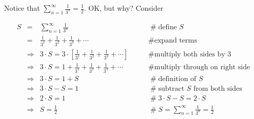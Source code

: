 \documentclass[11pt, oneside]{article}   	%
\begin{document}
Notice that  $\sum\limits_{n = 1}^\infty \frac{1}{3^n}  = \frac{1}{2}$. OK, but why? Consider 
      
\begin{equation*}
\begin{array}{lllll}
S
&=& \sum\limits_{n = 1}^\infty \frac{1}{3^n}                                                                            &\qquad  \mathrel{\#} \text{define $S$}                                \\ 
&=& \frac{1}{3^1} + \frac{1}{3^2} + \frac{1}{3^3} + \cdots                                                       &\qquad  \mathrel{\#} \text{expand terms}                           \\
&\Rightarrow& 3 \cdot S = 3 \cdot [\frac{1}{3^1} + \frac{1}{3^2} + \frac{1}{3^3} + \cdots ]      &\qquad  \mathrel{\#} \text{multiply both sides by 3}           \\
&\Rightarrow& 3 \cdot S = 1 + \frac{1}{3^1} + \frac{1}{3^2} + \frac{1}{3^3} + \cdots               &\qquad  \mathrel{\#} \text{multiply through on right side}  \\
&\Rightarrow& 3 \cdot S = 1 + S                                                                                             &\qquad  \mathrel{\#} \text{definition of $S$}                      \\
&\Rightarrow& 3 \cdot S - S = 1                                                                                              &\qquad  \mathrel{\#} \text{subtract $S$ from both sides}  \\
&\Rightarrow& 2 \cdot S  = 1                                                                                                  &\qquad  \mathrel{\#} 3 \cdot S - S = 2 \cdot S                    \\
&\Rightarrow& S  = \frac{1}{2}                                                                                                &\qquad  \mathrel{\#} S = \sum\limits_{n = 1}^\infty \frac{1}{3^n}  = \frac{1}{2}

\end{array}
\end{equation*}
\end{document}
